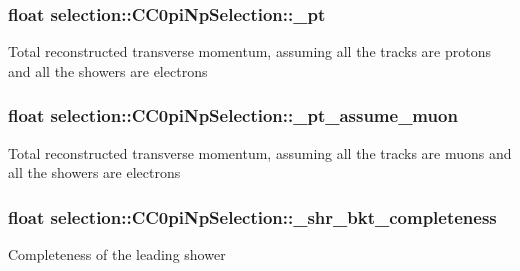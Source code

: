 \subsubsection[{\texorpdfstring{\+\_\+pt}{_pt}}]{\setlength{\rightskip}{0pt plus 5cm}float selection\+::\+C\+C0pi\+Np\+Selection\+::\+\_\+pt\hspace{0.3cm}{\ttfamily [private]}}\hypertarget{classselection_1_1CC0piNpSelection_a98281b58b33ff8c03fa9b00f3f3baa06}{}\label{classselection_1_1CC0piNpSelection_a98281b58b33ff8c03fa9b00f3f3baa06}
Total reconstructed transverse momentum, assuming all the tracks are protons and all the showers are electrons 
\subsubsection[{\texorpdfstring{\+\_\+pt\+\_\+assume\+\_\+muon}{_pt_assume_muon}}]{\setlength{\rightskip}{0pt plus 5cm}float selection\+::\+C\+C0pi\+Np\+Selection\+::\+\_\+pt\+\_\+assume\+\_\+muon\hspace{0.3cm}{\ttfamily [private]}}\hypertarget{classselection_1_1CC0piNpSelection_a4213e006ba267c2ff55415cc9ef07bf8}{}\label{classselection_1_1CC0piNpSelection_a4213e006ba267c2ff55415cc9ef07bf8}
Total reconstructed transverse momentum, assuming all the tracks are muons and all the showers are electrons 
\subsubsection[{\texorpdfstring{\+\_\+shr\+\_\+bkt\+\_\+completeness}{_shr_bkt_completeness}}]{\setlength{\rightskip}{0pt plus 5cm}float selection\+::\+C\+C0pi\+Np\+Selection\+::\+\_\+shr\+\_\+bkt\+\_\+completeness\hspace{0.3cm}{\ttfamily [private]}}\hypertarget{classselection_1_1CC0piNpSelection_ac3c3c9895ca501c3b73f14addfddf495}{}\label{classselection_1_1CC0piNpSelection_ac3c3c9895ca501c3b73f14addfddf495}
Completeness of the leading shower 
